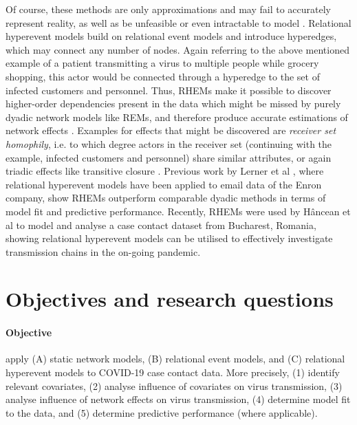\documentclass{article}
\begin{document}
	Of course, these methods are only approximations and may fail to accurately represent reality, as well as be unfeasible or even intractable to model \cite{lerner2021relational}. Relational hyperevent models \cite{lerner2021relational,lerner2019rem} build on relational event models and introduce hyperedges, which may connect any number of nodes. Again referring to the above mentioned example of a patient transmitting a virus to multiple people while grocery shopping, this actor would be connected through a hyperedge to the set of infected customers and personnel. Thus, RHEMs make it possible to discover higher-order dependencies present in the data which might be missed by purely dyadic network models like REMs, and therefore produce accurate estimations of network effects \cite{lerner2019rem}. Examples for effects that might be discovered are \emph{receiver set homophily}, i.e. to which degree actors in the receiver set (continuing with the example, infected customers and personnel) share similar attributes, or again triadic effects like transitive closure \cite{lerner2021relational}. Previous work by Lerner et al \cite{lerner2021relational}, where relational hyperevent models have been applied to email data of the Enron company, show RHEMs outperform comparable dyadic methods in terms of model fit and predictive performance. Recently, RHEMs were used by Hâncean et al \cite{hancean2022occupations} to model and analyse a case contact dataset from Bucharest, Romania, showing relational hyperevent models can be utilised to effectively investigate transmission chains in the on-going pandemic.
	\section{Objectives and research questions}
	\label{sec:Research_questions}
	\paragraph{Objective} apply (A) static network models, (B) relational event models, and (C) relational hyperevent models to COVID-19 case contact data. More precisely, (1) identify relevant covariates, (2) analyse influence of covariates on virus transmission, (3) analyse influence of network effects on virus transmission, (4) determine model fit to the data, and (5) determine predictive performance (where applicable).
\end{document}

